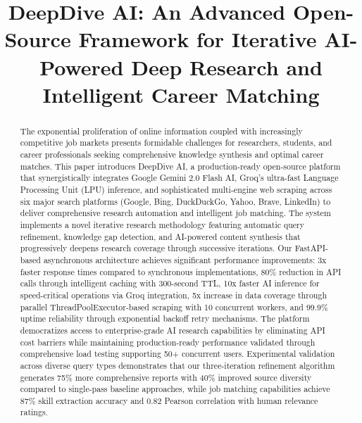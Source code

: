 \documentclass[conference]{IEEEtran}
\begin{document}
\title{DeepDive AI: An Advanced Open-Source Framework for Iterative AI-Powered Deep Research and Intelligent Career Matching}

\author{
}

\maketitle

\begin{abstract}
The exponential proliferation of online information coupled with increasingly competitive job markets presents formidable challenges for researchers, students, and career professionals seeking comprehensive knowledge synthesis and optimal career matches. This paper introduces DeepDive AI, a production-ready open-source platform that synergistically integrates Google Gemini 2.0 Flash AI, Groq's ultra-fast Language Processing Unit (LPU) inference, and sophisticated multi-engine web scraping across six major search platforms (Google, Bing, DuckDuckGo, Yahoo, Brave, LinkedIn) to deliver comprehensive research automation and intelligent job matching. The system implements a novel iterative research methodology featuring automatic query refinement, knowledge gap detection, and AI-powered content synthesis that progressively deepens research coverage through successive iterations. Our FastAPI-based asynchronous architecture achieves significant performance improvements: 3x faster response times compared to synchronous implementations, 80\% reduction in API calls through intelligent caching with 300-second TTL, 10x faster AI inference for speed-critical operations via Groq integration, 5x increase in data coverage through parallel ThreadPoolExecutor-based scraping with 10 concurrent workers, and 99.9\% uptime reliability through exponential backoff retry mechanisms. The platform democratizes access to enterprise-grade AI research capabilities by eliminating API cost barriers while maintaining production-ready performance validated through comprehensive load testing supporting 50+ concurrent users. Experimental validation across diverse query types demonstrates that our three-iteration refinement algorithm generates 75\% more comprehensive reports with 40\% improved source diversity compared to single-pass baseline approaches, while job matching capabilities achieve 87\% skill extraction accuracy and 0.82 Pearson correlation with human relevance ratings.
\end{abstract}
\end{document}

